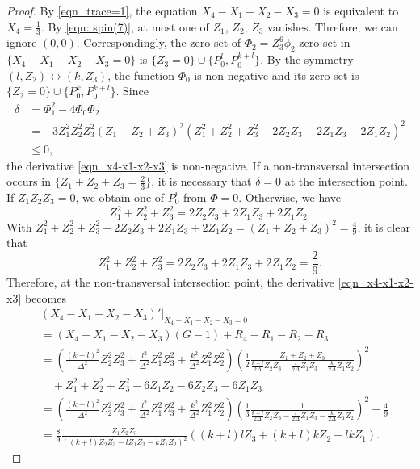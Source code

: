 \documentclass[11pt,letterpaper]{amsart}
\theoremstyle{definition}
\numberwithin{equation}{section}
\begin{document}
\begin{proof}
By \eqref{eqn_trace=1}, the equation $X_4-X_1-X_2-X_3=0$ is equivalent to $X_4=\frac{1}{3}$. By \eqref{eqn: spin(7)}, at most one of $Z_1$, $Z_2$, $Z_3$ vanishes. Threfore, we can ignore $(0,0)$. Correspondingly, the zero set of $\Phi_2=Z_3^6\phi_2$ zero set in $\{X_4-X_1-X_2-X_3=0\}$ is $\{Z_3 = 0\}\cup \{P_0^{l},P_0^{k+l}\}$. By the symmetry $(l,Z_2)\leftrightarrow (k,Z_3)$, the function $\Phi_0$ is non-negative and its zero set is $\{Z_2 = 0\}\cup \{P_0^{k},P_0^{k+l}\}$. Since 
\begin{equation}
\label{eqn_tricky discrim}
\begin{split}
\delta&=\Phi_1^2-4\Phi_0\Phi_2\\
&=-3 Z_1^{2} Z_2^{2} Z_3^{2} \left(Z_1+Z_2+Z_3\right)^{2} \left(Z_1^{2}+Z_2^{2}+Z_3^{2}-2 Z_2 Z_3-2 Z_1 Z_3-2 Z_1 Z_2\right)^{2}\\
&\leq 0,
\end{split}
\end{equation}
the derivative \eqref{eqn_x4-x1-x2-x3} is non-negative. If a non-transversal intersection occurs in $\{Z_1+Z_2+Z_3=\frac{2}{3}\}$, it is necessary that $\delta=0$ at the intersection point. If $Z_1Z_2Z_3=0$, we obtain one of $P_0^i$ from $\Phi=0$. Otherwise, we have 
$$
Z_1^2+Z_2^2+Z_3^2=2Z_2Z_3+2Z_1Z_3+2Z_1Z_2.
$$
With $Z_1^2+Z_2^2+Z_3^2+2Z_2Z_3+2Z_1Z_3+2Z_1Z_2=(Z_1+Z_2+Z_3)^2=\frac{4}{9}$, it is clear that 
$$Z_1^2+Z_2^2+Z_3^2=2Z_2Z_3+2Z_1Z_3+2Z_1Z_2=\frac{2}{9}.$$
Therefore, at the non-transversal intersection point, the derivative \eqref{eqn_x4-x1-x2-x3} becomes
\begin{equation}
\begin{split}
&\left.(X_4-X_1-X_2-X_3)'\right|_{X_4-X_1-X_2-X_3=0}\\
&=(X_4-X_1-X_2-X_3)(G-1)+R_4-R_1-R_2-R_3\\
&=\left(\frac{(k+l)^2}{\Delta^2}Z_2^2Z_3^2+\frac{l^2}{\Delta^2}Z_1^2Z_3^2+\frac{k^2}{\Delta^2}Z_1^2Z_2^2\right)\left(\frac{1}{2}\frac{Z_1+Z_2+Z_3}{\frac{k+l}{2\Delta}Z_2Z_3-\frac{l}{2\Delta}Z_1Z_3-\frac{k}{2\Delta}Z_1Z_2}\right)^2\\
&\quad +Z_1^2+Z_2^2+Z_3^2-6Z_1Z_2-6Z_2Z_3-6Z_1Z_3\\
&=\left(\frac{(k+l)^2}{\Delta^2}Z_2^2Z_3^2+\frac{l^2}{\Delta^2}Z_1^2Z_3^2+\frac{k^2}{\Delta^2}Z_1^2Z_2^2\right)\left(\frac{1}{3}\frac{1}{\frac{k+l}{2\Delta}Z_2Z_3-\frac{l}{2\Delta}Z_1Z_3-\frac{k}{2\Delta}Z_1Z_2}\right)^2-\frac{4}{9}\\
&=\frac{8}{9}\frac{Z_1Z_2Z_3}{\left((k+l)Z_2Z_3-lZ_1Z_3-kZ_1Z_2\right)^2}\left((k+l)lZ_3+(k+l)kZ_2-lkZ_1\right).
\end{split}

\end{equation}
\end{proof}
\end{document}
